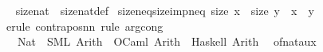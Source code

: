 \begin{isabellebody}
\isamarkupfalse%
%
\isadelimproof
\ %
\endisadelimproof
%
\isatagproof
\isacommand{{\isachardot}{\kern0pt}{\isachardot}{\kern0pt}}\isamarkupfalse%
%
\endisatagproof
{\isafoldproof}%
%
\isadelimproof
%
\endisadelimproof
\isanewline
\isanewline
{}\isamarkupfalse%
\isanewline
\isanewline
{}\isamarkupfalse%
\ size{\isacharunderscore}{\kern0pt}nat\ {\isacharequal}{\kern0pt}\ size{\isacharunderscore}{\kern0pt}nat{\isacharunderscore}{\kern0pt}def\isanewline
\isanewline
{}\isamarkupfalse%
\ size{\isacharunderscore}{\kern0pt}neq{\isacharunderscore}{\kern0pt}size{\isacharunderscore}{\kern0pt}imp{\isacharunderscore}{\kern0pt}neq{\isacharcolon}{\kern0pt}\ {\isachardoublequoteopen}size\ x\ {\isasymnoteq}\ size\ y\ {\isasymLongrightarrow}\ x\ {\isasymnoteq}\ y{\isachardoublequoteclose}\isanewline
%
\isadelimproof
\ \ %
\endisadelimproof
%
\isatagproof
{}\isamarkupfalse%
\ {\isacharparenleft}{\kern0pt}erule\ contrapos{\isacharunderscore}{\kern0pt}nn{\isacharparenright}{\kern0pt}\ {\isacharparenleft}{\kern0pt}rule\ arg{\isacharunderscore}{\kern0pt}cong{\isacharparenright}{\kern0pt}%
\endisatagproof
{\isafoldproof}%
%
\isadelimproof
%
\endisadelimproof
%
\isadelimdocument
%
\endisadelimdocument
%
\isatagdocument
%
\isamarkuptrue%
%
\endisatagdocument
{\isafolddocument}%
%
\isadelimdocument
%
\endisadelimdocument
{}\isamarkupfalse%
\isanewline
\ \ \ Nat\ {\isasymrightharpoonup}\ {\isacharparenleft}{\kern0pt}SML{\isacharparenright}{\kern0pt}\ Arith\ \ {\isacharparenleft}{\kern0pt}OCaml{\isacharparenright}{\kern0pt}\ Arith\ \ {\isacharparenleft}{\kern0pt}Haskell{\isacharparenright}{\kern0pt}\ Arith\isanewline
\isanewline
{}\isamarkupfalse%
\ {\isacharparenleft}{\kern0pt}\ of{\isacharunderscore}{\kern0pt}nat{\isacharunderscore}{\kern0pt}aux\isanewline
%
\isadelimtheory
\isanewline
%
\endisadelimtheory
%
\isatagtheory
{}\isamarkupfalse%
%
\endisatagtheory
{\isafoldtheory}%
%
\isadelimtheory
%
\endisadelimtheory
%
\end{isabellebody}%
\endinput
